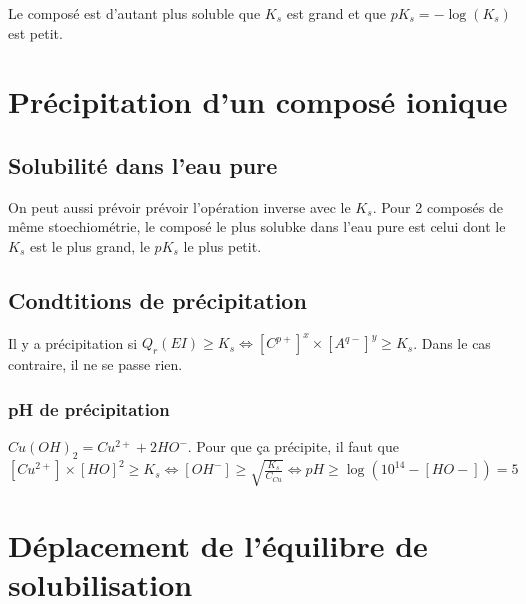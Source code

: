 \documentclass[french]{yLectureNote}
\begin{document}
Le composé est d'autant plus soluble que $K_s$ est grand et que $pK_s = -\log(K_s)$ est petit.

	\section{Précipitation d'un composé ionique}
	\subsection{Solubilité dans l'eau pure}
	On peut aussi prévoir prévoir l'opération inverse avec le $K_s$.
	Pour 2 composés de m\^eme stoechiométrie, le composé le plus solubke dans l'eau pure est celui dont le $K_s$  est le plus grand, le $pK_s$ le plus petit.
	\subsection{Condtitions de précipitation}
	\begin{definition}
	Il y a précipitation  si \(Q_r(EI) \geq K_s \iff [C^{p+}]^x\times [A^{q-}]^y \geq K_s\). Dans le cas contraire, il ne se passe rien.
	\end{definition}
\subsubsection{pH de précipitation}
	\(Cu(OH)_2 = Cu^{2+} + 2HO^-\). Pour que ça précipite, il faut que $[Cu^{2+}]\times [HO]^2 \geq K_s \iff [OH^-] \geq \sqrt{\frac{K_s}{C_{Cu}}} \iff pH \geq \log(10^{14}- [HO-]) = 5$
	\section{Déplacement de l'équilibre de solubilisation}
\end{document}
